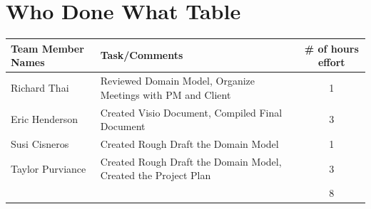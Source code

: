\documentclass{article}
\begin{document}
\section{Who Done What Table}
\begin{tabular}{ | l | p{3in} | c | }
\hline
Team Member Names & Task/Comments & \# of hours effort\\
\hline
\hline
Richard Thai & Reviewed Domain Model, Organize Meetings with PM and Client & 1\\
\hline
Eric Henderson & Created Visio Document, Compiled Final Document & 3\\
\hline
Susi Cisneros & Created Rough Draft the Domain Model & 1\\
\hline
Taylor Purviance & Created Rough Draft the Domain Model, Created the Project Plan & 3\\
\hline
 &  & 8\\
\hline
\end{tabular}
\end{document}
